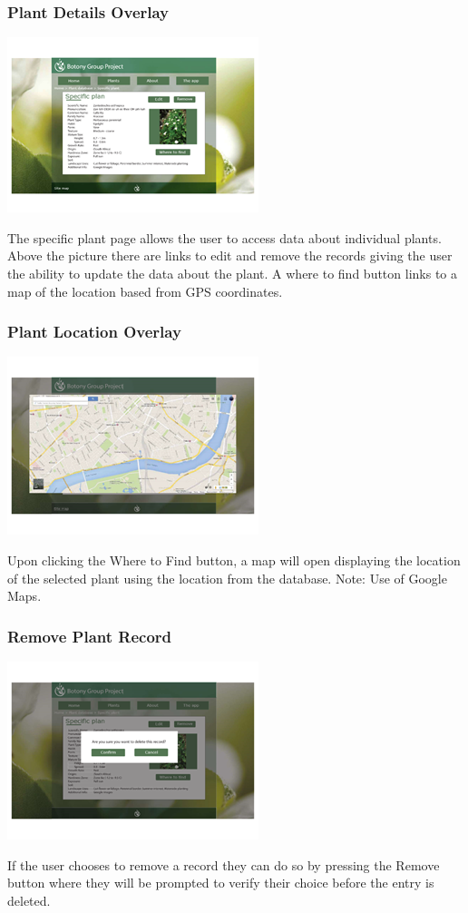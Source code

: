 \documentclass[11pt, titlepage]{article}
\begin{document}
		\subsubsection{Plant Details Overlay}
			\begin{center}
				\includegraphics[scale=1]{res/botanyWebPlantDetailsOverlay.png}
			\end{center}
			The specific plant page allows the user to access data about individual plants. Above the picture there are links to edit and remove the records giving the user the ability to update the data about the plant. A where to find button links to a map of the location based from GPS coordinates.
					\subsubsection{Plant Location Overlay}
			\begin{center}
				\includegraphics[scale=1]{res/botanyWebPlantMap.png}
			\end{center}
			Upon clicking the Where to Find button, a map will open displaying the location of the selected plant using the location from the database.
Note: Use of Google Maps.
			\subsubsection{Remove Plant Record}
			\begin{center}
				\includegraphics[scale=1]{res/botanyWebPlantRemoval.png}
			\end{center}
			If the user chooses to remove a record they can do so by pressing the Remove button where they will be prompted to verify their choice before the entry is deleted.
			
\end{document}
